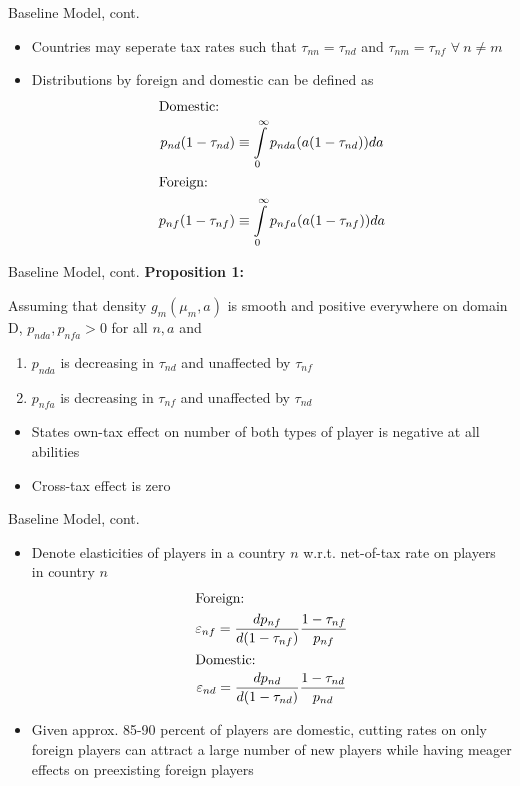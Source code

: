 \documentclass[aspectratio=169,professionalfonts]{beamer}
\newcommand{\hl}[1]{\textbf{\textcolor{UGARed}{#1}}}
\newcommand{\hl}[1]{\textbf{\color{UGARed}{#1}}}
\begin{document}
\begin{frame}{Baseline Model, cont.}
  \begin{itemize}
    \item Countries may seperate tax rates such that $\tau_{nn} = \tau_{nd}$ and $\tau_{nm} = \tau_{nf}$ $\forall \ n\ne m$
    \item Distributions by foreign and domestic can be defined as 
    \begin{gather*}
      \shortintertext{Domestic:}
      p_{nd}(1-\tau_{nd})\equiv\int\limits_0^{\infty}p_{nda}(a(1-\tau_{nd}))da \\
      \shortintertext{Foreign:}
      p_{nf}(1-\tau_{nf})\equiv\int\limits_0^{\infty}p_{nfa}(a(1-\tau_{nf}))da
    \end{gather*}
  \end{itemize}
\end{frame}
\begin{frame}{Baseline Model, cont.}
  \hl{Proposition 1:}
  \begin{tcolorbox}[colback=red!5!white,colframe=red!75!black]
    Assuming that density $g_m(\mu_m, a)$ is smooth and positive everywhere on domain D, $p_{nda}, p_{nfa} > 0$
    for all $n, a$ and
    \begin{enumerate}
      \item $p_{nda}$ is decreasing in $\tau_{nd}$ and unaffected by $\tau_{nf}$
      \item $p_{nfa}$ is decreasing in $\tau_{nf}$ and unaffected by $\tau_{nd}$
    \end{enumerate}
  \end{tcolorbox}
  \begin{itemize}
    \item States own-tax effect on number of both types of player is negative at all abilities
    \item Cross-tax effect is zero
  \end{itemize}
\end{frame}
\begin{frame}{Baseline Model, cont.}
  \begin{itemize}
    \item Denote elasticities of players in a country $n$ w.r.t. net-of-tax rate on players in country $n$
    \begin{gather*}
      \shortintertext{Foreign:}
      \varepsilon_{nf} = \frac{dp_{nf}}{d(1-\tau_{nf})}\frac{1-\tau_{nf}}{p_{nf}} \\
      \shortintertext{Domestic:}
      \varepsilon_{nd} = \frac{dp_{nd}}{d(1-\tau_{nd})}\frac{1-\tau_{nd}}{p_{nd}} \\
    \end{gather*}
    \item Given approx. 85-90 percent of players are domestic, cutting rates on only foreign players can attract a large number of new players while having meager effects on preexisting foreign players
  \end{itemize}
\end{frame}
\end{document}
